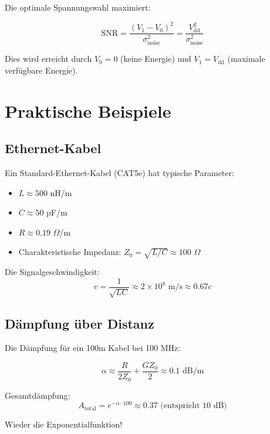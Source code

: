 ﻿\documentclass[12pt,a4paper]{article}
\theoremstyle{definition}
\theoremstyle{remark}
\begin{document}
Die optimale Spannungswahl maximiert:

\begin{equation}
\text{SNR} = \frac{(V_1 - V_0)^2}{\sigma_{\text{noise}}^2} = \frac{V_{\text{dd}}^2}{\sigma_{\text{noise}}^2}
\end{equation}

Dies wird erreicht durch $V_0 = 0$ (keine Energie) und $V_1 = V_{\text{dd}}$ (maximale verfügbare Energie).

\section{Praktische Beispiele}

\subsection{Ethernet-Kabel}

Ein Standard-Ethernet-Kabel (CAT5e) hat typische Parameter:
\begin{itemize}
\item $L \approx 500$ nH/m
\item $C \approx 50$ pF/m
\item $R \approx 0.19$ $\Omega$/m
\item Charakteristische Impedanz: $Z_0 = \sqrt{L/C} \approx 100$ $\Omega$
\end{itemize}

Die Signalgeschwindigkeit:
\begin{equation}
v = \frac{1}{\sqrt{LC}} \approx 2 \times 10^8 \text{ m/s} \approx 0.67c
\end{equation}

\subsection{Dämpfung über Distanz}

Die Dämpfung für ein 100m Kabel bei 100 MHz:

\begin{equation}
\alpha \approx \frac{R}{2Z_0} + \frac{GZ_0}{2} \approx 0.1 \text{ dB/m}
\end{equation}

Gesamtdämpfung:
\begin{equation}
A_{\text{total}} = e^{-\alpha \cdot 100} \approx 0.37 \text{ (entspricht 10 dB)}
\end{equation}

Wieder die Exponentialfunktion!
\end{document}
